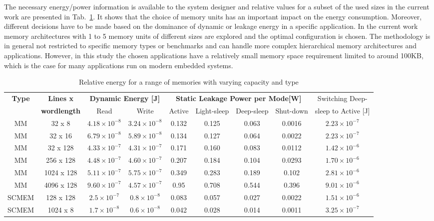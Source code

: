 \documentclass[a4paper,conference]{IEEEtran}
\begin{document}
The necessary energy/power information is available to the system designer and relative values for a subset of the used sizes in the current work are presented in Tab.~\ref{tab:relative}. It shows that the choice of memory units has an important impact on the energy consumption. Moreover, different decisions have to be made based on the dominance of dynamic or leakage energy in a specific application. In the current work memory architectures with 1 to 5 memory units  of different sizes are explored and the optimal configuration is chosen. The methodology is in general not restricted to specific memory types or benchmarks and can handle more complex hierarchical memory architectures and applications. However, in this study the chosen applications have a relatively small memory space requirement limited to around 100KB, which is the case for many applications run on modern embedded systems. 
\begin{center}
	\begin{table}[!t]
	\caption{Relative energy for a range of memories with varying capacity and type}
	\label{tab:relative}
	{\small
\hfill{}
	\begin{tabular}{|c|c|c|c|c|c|c|c|c|}
		\hline
		\multirow{2}{*}{\textbf{Type}} & \textbf{Lines x} & \multicolumn{2}{c|}{\textbf{Dynamic Energy [J]}}& \multicolumn{4}{c|}{\textbf{Static Leakage Power per Mode[W]}} & {Switching Deep-} \\ \cline{3-8}
		& \textbf{wordlength} & Read & Write & Active & Light-sleep & Deep-sleep & Shut-down &sleep to Active [J]\\ 
		\hline 
		MM & 32 x 8 &  $ 4.18 \times 10^{-8} $ &  $ 3.24 \times 10^{-8} $ & 0.132 & 0.125 & 0.063 & 0.0016 & $ 2.23 \times 10^{-7} $ \\ 
		\hline
		MM & 32 x 16 & $  6.79 \times 10^{-8} $ &  $ 5.89 \times 10^{-8} $ & 0.134 & 0.127 & 0.064 & 0.0022 & $ 2.23 \times 10^{-7} $ \\ 
		\hline
		MM & 32 x 128 & $  4.33 \times 10^{-7} $ &  $ 4.31 \times 10^{-7} $ & 0.171 & 0.160 & 0.083 & 0.0112 & $ 1.42 \times 10^{-6} $ \\ 
		\hline
		MM & 256 x 128 & $  4.48 \times 10^{-7} $ &  $ 4.60 \times 10^{-7} $ & 0.207 & 0.184 & 0.104 & 0.0293 & $ 1.70 \times 10^{-6} $ \\ 
		\hline
		MM & 1024 x 128 & $  5.11 \times 10^{-7} $ &  $ 5.75 \times 10^{-7} $ & 0.349 & 0.283 & 0.189 & 0.102 & $ 2.81 \times 10^{-6} $ \\ 
		\hline
		MM & 4096 x 128 & $  9.60 \times 10^{-7} $ &  $ 4.57 \times 10^{-7} $ & 0.95 & 0.708 & 0.544 & 0.396 & $ 9.01 \times 10^{-6} $ \\ 
		\hline
		SCMEM & 128 x 128 & $  2.5 \times 10^{-7} $ &  $ 0.8 \times 10^{-8} $ & 0.083 & 0.057 & 0.027 & 0.0022 & $ 1.51 \times 10^{-6} $ \\ 
		\hline
		SCMEM & 1024 x 8 & $  1.7 \times 10^{-8} $ &  $ 0.6 \times 10^{-8} $ & 0.042 &
		 0.028 & 0.014 & 0.0011 & $ 3.25 \times 10^{-7} $ \\ 
		\hline
	\end{tabular}}
	\end{table}
\end{center}
\end{document}
